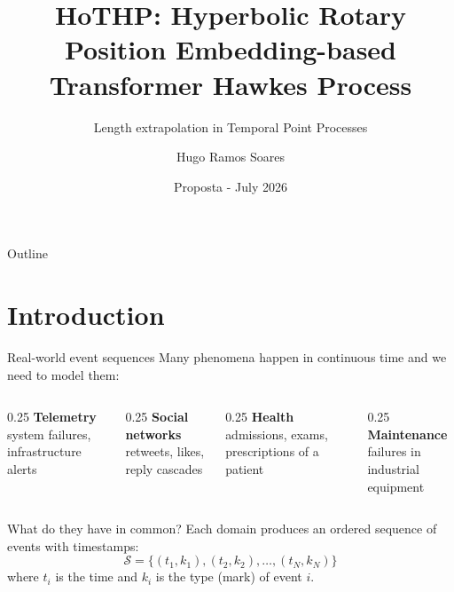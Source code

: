 \documentclass[aspectratio=169]{beamer}
\title[HoTHP]{HoTHP: Hyperbolic Rotary Position Embedding-based Transformer Hawkes Process}
\subtitle{Length extrapolation in Temporal Point Processes}
\author[H. R. Soares]{Hugo Ramos Soares}
\institute[UFC]{Universidade Federal do Ceará \\[1em]
    {\small Orientador: César Lincoln C. Mattos (UFC)} \\
    {\small Coorientador: João Paulo Pordeus Gomes (UFC)} \\[0.3em]
    {\small Banca: José Antonio Fernandes de Macêdo (UFC) \\
    Diego Parente Paiva Mesquita (FGV)}
}
\date{Proposta - July 2026}
\begin{document}
\begin{frame}
  \titlepage
\end{frame}

\begin{frame}{Outline}
  \tableofcontents
\end{frame}

\section{Introduction}

\begin{frame}{Real-world event sequences}
  Many phenomena happen in continuous time and we need to model them:
  \vspace{0.4em}
  \begin{columns}[T]
    \begin{column}{0.25\textwidth}
      \centering
      \textbf{Telemetry} \\
      \small system failures, infrastructure alerts
    \end{column}
    \begin{column}{0.25\textwidth}
      \centering
      \textbf{Social networks} \\
      \small retweets, likes, reply cascades
    \end{column}
    \begin{column}{0.25\textwidth}
      \centering
      \textbf{Health} \\
      \small admissions, exams, prescriptions of a patient
    \end{column}
    \begin{column}{0.25\textwidth}
      \centering
      \textbf{Maintenance} \\
      \small failures in industrial equipment
    \end{column}
  \end{columns}
  \vspace{0.8em}
  \begin{block}{What do they have in common?}
    Each domain produces an ordered sequence of events with timestamps:
    \[
      \mathcal{S} = \{(t_1, k_1), (t_2, k_2), \ldots, (t_N, k_N)\}
    \]
    where $t_i$ is the time and $k_i$ is the type (mark) of event $i$.
  \end{block}
\end{frame}
\end{document}
